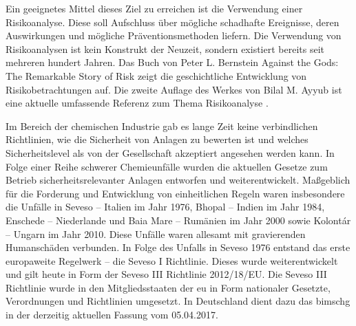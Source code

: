 Ein geeignetes Mittel dieses Ziel zu erreichen ist die Verwendung einer Risikoanalyse. Diese soll Aufschluss \"uber m\"ogliche schadhafte Ereignisse, deren Auswirkungen und m\"ogliche Pr\"aventionsmethoden liefern. Die Verwendung von Risikoanalysen ist kein Konstrukt der Neuzeit, sondern existiert bereits seit mehreren hundert Jahren. Das Buch von Peter L. Bernstein \glqq Against the Gods: The Remarkable Story of Risk\grqq { } \cite{Bernstein_1998} zeigt die geschichtliche Entwicklung von Risikobetrachtungen auf. Die zweite Auflage des Werkes von Bilal M. Ayyub ist eine aktuelle umfassende Referenz zum Thema Risikoanalyse \cite{Ayyub_2014}.

Im Bereich der chemischen Industrie gab es lange Zeit keine verbindlichen Richtlinien, wie die Sicherheit von Anlagen zu bewerten ist und welches Sicherheitslevel als von der Gesellschaft akzeptiert angesehen werden kann. In Folge einer Reihe schwerer Chemieunf\"alle wurden die aktuellen Gesetze zum Betrieb sicherheitsrelevanter Anlagen entworfen und weiterentwickelt.\linebreak
Ma\ss{}geblich f\"ur die Forderung und Entwicklung von einheitlichen Regeln waren insbesondere die Unf\"alle in Seveso -- Italien im Jahr 1976, Bhopal -- Indien im Jahr 1984, Enschede -- Niederlande und Baia Mare -- Rum\"anien im Jahr 2000 sowie Kolont\'ar -- Ungarn im Jahr 2010. Diese Unf\"alle waren allesamt mit gravierenden Humansch\"aden verbunden. In Folge des Unfalls in Seveso 1976 entstand das erste europaweite Regelwerk -- die {Seveso I} Richtlinie. Dieses  wurde weiterentwickelt und gilt heute in Form der {Seveso III} Richtlinie 2012/18/EU. Die {Seveso III} Richtlinie wurde in den Mitgliedsstaaten der \ac{eu} in Form nationaler Gesetzte, Verordnungen und Richtlinien umgesetzt. In Deutschland dient dazu das \ac{bimschg} in der derzeitig aktuellen Fassung vom 05.04.2017.


